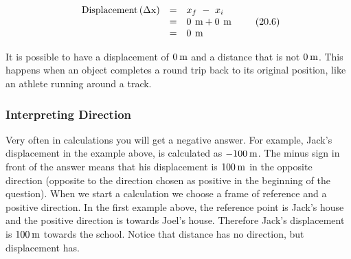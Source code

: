     \begin{equation}
    \begin{array}{ccc}\hfill \mathrm{Displacement}\left(\Delta \mathrm{x}\right)& =& {x}_{f}\phantom{\rule{3.33333pt}{0ex}}-\phantom{\rule{3.33333pt}{0ex}}{x}_{i}\hfill \\ & =& 0\phantom{\rule{4pt}{0ex}}\mathrm{m}+0\phantom{\rule{4pt}{0ex}}\mathrm{m}\hfill \\ & =& 0\phantom{\rule{4pt}{0ex}}\mathrm{m}\hfill \end{array}\tag{20.6}
      \end{equation}
      \par 
      \label{m38788*id63886}It is possible to have a displacement of $0\phantom{\rule{2pt}{0ex}}\mathrm{m}$ and a distance that is not $0\phantom{\rule{2pt}{0ex}}\mathrm{m}$. This happens when an object completes a round trip back to its original position, like an athlete running around a track.\par 
      \label{m38788*uid18}
            \subsubsection{ Interpreting Direction}
            \nopagebreak
        \label{m38788*id63901}Very often in calculations you will get a negative answer. For example, Jack's displacement in the example above, is calculated as $-100\phantom{\rule{2pt}{0ex}}\mathrm{m}$. The minus sign in front of the answer means that his displacement is $100\phantom{\rule{2pt}{0ex}}\mathrm{m}$ in the opposite direction (opposite to the direction chosen as positive in the beginning of the question). When we start a calculation we choose a frame of reference and a positive direction. In the first example above, the reference point is Jack's house and the positive direction is towards Joel's house. Therefore Jack's displacement is $100\phantom{\rule{2pt}{0ex}}\mathrm{m}$ towards the school. Notice that distance has no direction, but displacement has.\par 
      \label{m38788*uid19}
